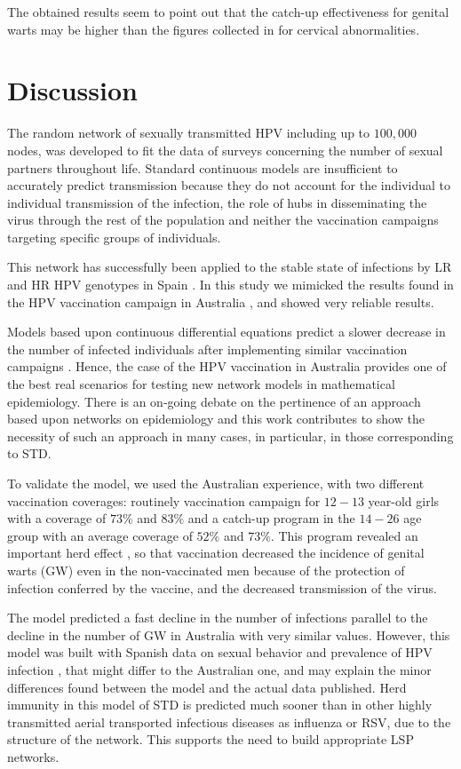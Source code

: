 The obtained results seem to point out that the catch-up effectiveness for genital warts may be higher than the figures collected in \cite{Skufca} for cervical abnormalities.  

\section{Discussion}
The random network of sexually transmitted HPV including up to $100,000$ nodes, was developed to fit the data of surveys concerning the number of sexual partners throughout life. Standard continuous models are insufficient to accurately predict transmission because they do not account for the individual to individual transmission of the infection, the role of hubs in disseminating the virus through the rest of the population and neither the vaccination campaigns targeting specific groups of individuals.

This network has successfully been applied to the stable state of infections by LR and HR HPV genotypes in Spain  \cite{Acedo2017}. In this study we mimicked the results found in the HPV vaccination campaign in Australia \cite{ali2013genital}, and showed very reliable results. 

Models based upon continuous differential equations predict a slower decrease in the number of infected individuals after implementing similar vaccination campaigns \cite{elbasha2007model}. Hence, the case of the HPV vaccination in Australia provides one of the best real scenarios for testing new network models in mathematical epidemiology. There is an on-going debate on the pertinence of an approach based upon networks on epidemiology \cite{Eubank} and this work contributes to show the necessity of such an approach in many cases, in particular, in those corresponding to STD.

To validate the model, we used the Australian experience, with two different vaccination coverages: routinely vaccination campaign for $12-13$ year-old girls with a coverage of $73\%$ and $83\%$ and a catch-up program in the $14-26$ age group with an average coverage of $52\%$ and $73\%$. This program revealed an important herd effect \cite{ali2013genital}, so that vaccination decreased the incidence of genital warts (GW) even in the non-vaccinated men because of the protection of infection conferred by the vaccine, and the decreased transmission of the virus.

The model predicted a fast decline in the number of infections parallel to the decline in the number of GW in Australia with very similar values. However, this model was built with Spanish data on sexual behavior \cite{INE} and prevalence of HPV infection \cite{castellsague2012prevalence}, that might differ to the Australian one, and may explain the minor differences found between the model and the actual data published. Herd immunity in this model of STD is predicted much sooner than in other highly transmitted aerial transported infectious diseases as influenza or RSV, due to the structure of the network. This supports the need to build appropriate LSP networks. 


